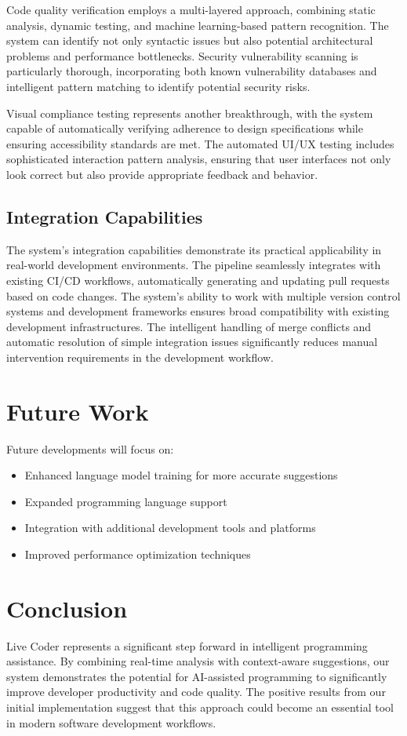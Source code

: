 \documentclass{lxaiproposal}
\begin{document}
Code quality verification employs a multi-layered approach, combining static analysis, dynamic testing, and machine learning-based pattern recognition. The system can identify not only syntactic issues but also potential architectural problems and performance bottlenecks. Security vulnerability scanning is particularly thorough, incorporating both known vulnerability databases and intelligent pattern matching to identify potential security risks.

Visual compliance testing represents another breakthrough, with the system capable of automatically verifying adherence to design specifications while ensuring accessibility standards are met. The automated UI/UX testing includes sophisticated interaction pattern analysis, ensuring that user interfaces not only look correct but also provide appropriate feedback and behavior.

\subsection{Integration Capabilities}
The system's integration capabilities demonstrate its practical applicability in real-world development environments. The pipeline seamlessly integrates with existing CI/CD workflows, automatically generating and updating pull requests based on code changes. The system's ability to work with multiple version control systems and development frameworks ensures broad compatibility with existing development infrastructures. The intelligent handling of merge conflicts and automatic resolution of simple integration issues significantly reduces manual intervention requirements in the development workflow.

\section{Future Work}
Future developments will focus on:

\begin{itemize}
    \item Enhanced language model training for more accurate suggestions
    \item Expanded programming language support
    \item Integration with additional development tools and platforms
    \item Improved performance optimization techniques
\end{itemize}

\section{Conclusion}
Live Coder represents a significant step forward in intelligent programming assistance. By combining real-time analysis with context-aware suggestions, our system demonstrates the potential for AI-assisted programming to significantly improve developer productivity and code quality. The positive results from our initial implementation suggest that this approach could become an essential tool in modern software development workflows.
\end{document}
